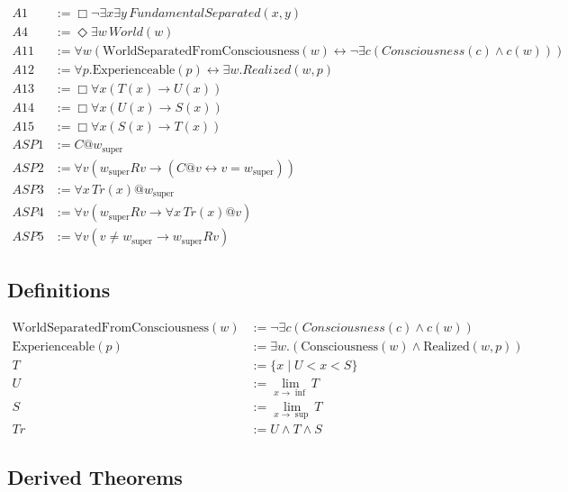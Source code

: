 \documentclass[
]{article}
\begin{document}
\[
\begin{aligned}
A1 &:= \Box\neg\exists x\exists y\, FundamentalSeparated(x,y) \\
A4 &:= \Diamond\exists w\, World(w) \\
A11 &:= \forall w \left( \text{WorldSeparatedFromConsciousness}(w) \leftrightarrow \neg \exists c (Consciousness(c) \land c(w)) \right) \\
A12 &:= \forall p. \text{Experienceable}(p) \leftrightarrow \exists w. Realized(w, p) \\
A13 &:= \Box\forall x(T(x) \rightarrow U(x)) \\
A14 &:= \Box\forall x(U(x) \rightarrow S(x)) \\
A15 &:= \Box\forall x(S(x) \rightarrow T(x)) \\
ASP1 &:= C @ w_{\text{super}} \\
ASP2 &:= \forall v (w_{\text{super}} R v \rightarrow (C @ v \leftrightarrow v = w_{\text{super}})) \\
ASP3 &:= \forall x\,Tr(x) @ w_{\text{super}} \\
ASP4 &:= \forall v (w_{\text{super}} R v \rightarrow \forall x\,Tr(x) @ v) \\
ASP5 &:= \forall v (v \neq w_{\text{super}} \rightarrow w_{\text{super}} R v)
\end{aligned}
\]

\subsection{Definitions}

\[
\begin{aligned}
\text{WorldSeparatedFromConsciousness}(w) &:= \neg \exists c (Consciousness(c) \land c(w)) \\
\text{Experienceable}(p) &:= \exists w. (\text{Consciousness}(w) \land \text{Realized}(w, p)) \\
T &:= \{ x \mid U < x < S \} \\
U &:= \lim_{x \to \inf} T \\
S &:= \lim_{x \to \sup} T \\
Tr &:= U \land T \land S
\end{aligned}
\]

\subsection{Derived Theorems}
\end{document}
